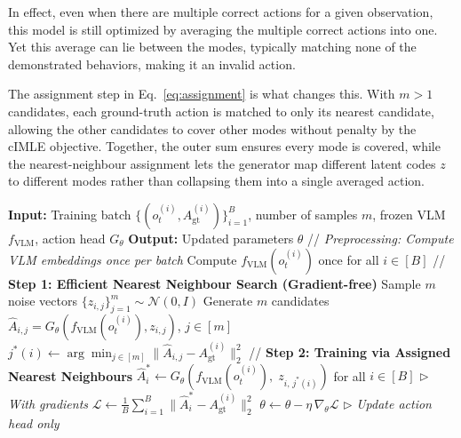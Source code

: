 \documentclass[letterpaper, 10 pt, conference]{ieeeconf}  %
\begin{document}
In effect, even when there are multiple correct actions for a given observation, this model is still optimized by averaging the multiple correct actions into one. Yet this average can lie between the modes, typically matching none of the demonstrated behaviors, making it an invalid action.

The assignment step in Eq.~\ref{eq:assignment} is what changes this. With $m>1$ candidates, each ground-truth action is matched to only its nearest candidate, allowing the other candidates to cover other modes without penalty by the cIMLE objective. Together, the outer sum ensures every mode is covered, while the nearest-neighbour assignment lets the generator map different latent codes $z$ to different modes rather than collapsing them into a single averaged action.

\begin{algorithm}[htbp]
\caption{cIMLE Training}\label{alg:cimle}
\begin{algorithmic}\raggedright
\STATE \textbf{Input:} Training batch $\{(o_t^{(i)}, A_{\mathrm{gt}}^{(i)})\}_{i=1}^{B}$, number of samples $m$, frozen VLM $f_{\mathrm{VLM}}$, action head $G_\theta$
\STATE \textbf{Output:} Updated parameters $\theta$
\STATE
\STATE // \textit{Preprocessing: Compute VLM embeddings once per batch}
\STATE Compute $f_{\mathrm{VLM}}(o_t^{(i)})$ once for all $i \in [B]$
\STATE // \textbf{Step 1: Efficient Nearest Neighbour Search (Gradient-free)}
  \STATE Sample $m$ noise vectors $\{z_{i,j}\}_{j=1}^{m} \sim \mathcal{N}(0, I)$
  \STATE Generate $m$ candidates $\hat{A}_{i,j} = G_\theta(f_{\mathrm{VLM}}(o_t^{(i)}), z_{i,j})$, $j \in [m]$
  \STATE $j^{*}(i) \leftarrow \arg\min_{j \in [m]} \lVert \hat{A}_{i,j} - A_{\mathrm{gt}}^{(i)} \rVert_2^2$ 
\ENDFOR
\STATE
\STATE // \textbf{Step 2: Training via Assigned Nearest Neighbours}
\STATE $\hat{A}_{i}^{*} \leftarrow G_\theta(f_{\mathrm{VLM}}(o_t^{(i)}),\; z_{i,\,j^{*}(i)})$ for all $i \in [B]$ \hfill $\triangleright$ \textit{With gradients}
\STATE $\mathcal{L} \leftarrow \frac{1}{B}\sum_{i=1}^{B} \lVert \hat{A}_{i}^{*} - A_{\mathrm{gt}}^{(i)} \rVert_2^2$
\STATE $\theta \leftarrow \theta - \eta\,\nabla_\theta \mathcal{L}$ \hfill $\triangleright$ \textit{Update action head only}
\end{algorithmic}
\end{algorithm}
\end{document}
